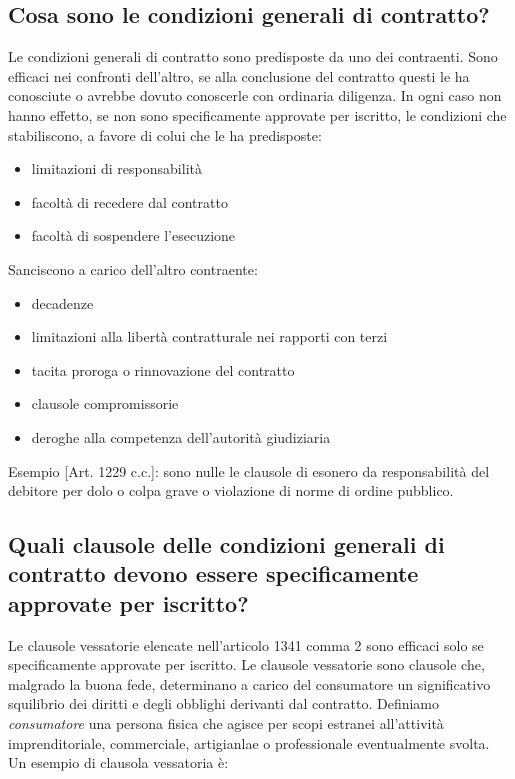 \subsection{Cosa sono le condizioni generali di contratto?}
Le condizioni generali di contratto sono predisposte da uno dei contraenti. Sono efficaci nei confronti dell'altro, se
alla conclusione del contratto questi le ha conosciute o avrebbe dovuto conoscerle con ordinaria diligenza.
In ogni caso non hanno effetto, se non sono specificamente approvate per iscritto, le condizioni che stabiliscono,
a favore di colui che le ha predisposte:
\begin{itemize}
    \item limitazioni di responsabilità
    \item facoltà di recedere dal contratto
    \item facoltà di sospendere l'esecuzione
\end{itemize}
Sanciscono a carico dell'altro contraente:
\begin{itemize}
    \item decadenze
    \item limitazioni alla libertà contratturale nei rapporti con terzi
    \item tacita proroga o rinnovazione del contratto
    \item clausole compromissorie
    \item deroghe alla competenza dell'autorità giudiziaria
\end{itemize}
Esempio [Art. 1229 c.c.]: sono nulle le clausole di esonero da responsabilità
del debitore per dolo o colpa grave o violazione di norme di ordine pubblico.

\subsection{Quali clausole delle condizioni generali di contratto devono essere specificamente approvate per iscritto?}
Le clausole vessatorie elencate nell'articolo 1341 comma 2 sono efficaci solo se specificamente
approvate per iscritto. Le clausole vessatorie sono clausole che, malgrado la buona fede,
determinano a carico del consumatore un significativo squilibrio dei diritti e degli obblighi derivanti
dal contratto.\newline
Definiamo \emph{consumatore} una persona fisica che agisce per scopi estranei all'attività imprenditoriale, commerciale,
artigianlae o professionale eventualmente svolta.\newline
Un esempio di clausola vessatoria è: \newline \newline

